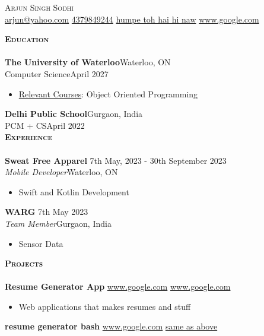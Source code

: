 \documentclass[a4paper]{article}
\newcommand{\lineunder} {
    \vspace*{-8pt} \\
    \hspace*{-18pt} \hrulefill \\
}
\newcommand{\header} [1] {
    {\hspace*{-18pt}\vspace*{6pt} \textsc{#1}}
    \vspace*{-6pt} \lineunder
}
\begin{document}
\vspace*{-40pt} 

\vspace*{-10pt}
        \begin{center}
        {\Huge \scshape Arjun Singh Sodhi} \vspace{2pt} \\
        \href{mailto:arjun@yahoo.com}{arjun@yahoo.com}
        \vline \hspace{.5pt} \href{tel:4379849244}{4379849244} 
 \vline \hspace{.5pt} \href{humpe toh hai hi naw}{humpe toh hai hi naw} 
 \vline \hspace{.5pt} \href{www.google.com}{www.google.com} 
\end{center} 
\header{\textbf{Education}} 
\textbf{The University of Waterloo}\hfill Waterloo, ON\\ 
Computer Science\hfill April 2027\\ 
\begin{itemize} \itemsep 0pt 
 \item{\underline{Relevant Courses}: Object Oriented Programming} 
 \end{itemize} 
\textbf{Delhi Public School}\hfill Gurgaon, India\\ 
PCM + CS\hfill April 2022\\ 
\header{\textbf{Experience}} 
\textbf{Sweat Free Apparel} \hfill 7th May, 2023 - 30th September 2023\\ 
\textit{Mobile Developer}\hfill Waterloo, ON\\ 
\begin{itemize} \itemsep 0pt 
 \item{Swift and Kotlin Development} 
 \end{itemize} 
\textbf{WARG} \hfill 7th May 2023\\ 
\textit{Team Member}\hfill Gurgaon, India\\ 
\begin{itemize} \itemsep 0pt 
 \item{Sensor Data} 
 \end{itemize} 
\header{\textbf{Projects}} 
\textbf{Resume Generator App} \vline \; \url{www.google.com}\; \vline \; \url{www.google.com}\\ 
\begin{itemize} \itemsep 0pt 
 \item{Web applications that makes resumes and stuff} 
 \end{itemize} 
\textbf{resume generator bash} \vline \; \url{www.google.com}\; \vline \; \url{same as above}\\ 
\end{document}
